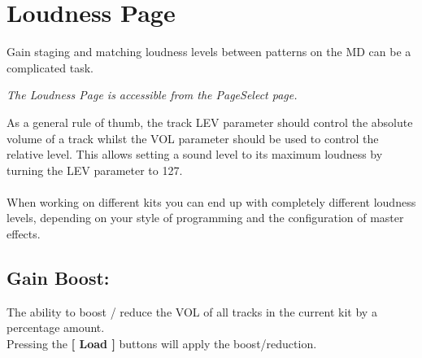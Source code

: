\chapter{Loudness Page}
Gain staging and matching loudness levels between patterns on the MD can be a complicated task.

\textit{The Loudness Page is accessible from the PageSelect page.}

As a general rule of thumb, the track LEV parameter should control the absolute volume of a track whilst the VOL parameter should be used to control the relative level. This allows setting a sound level to its maximum loudness by turning the LEV parameter to 127.\\
\\
When working on different kits you can end up with completely different loudness levels, depending on your style of programming and the configuration of master effects.



\section{Gain Boost:}
The ability to boost / reduce the VOL of all tracks in the current kit by a percentage amount.
\\Pressing the \textbf{[ Load ]} buttons will apply the boost/reduction.

